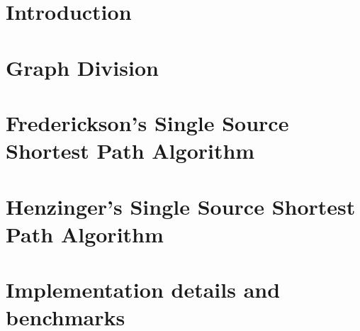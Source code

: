 \documentclass{report}
\begin{document}

\pagebreak

\tableofcontents

\pagebreak

\chapter{Introduction}


\chapter{Graph Division}


\chapter{Frederickson's Single Source Shortest Path Algorithm}


\chapter {Henzinger's Single Source Shortest Path Algorithm}


\chapter {Implementation details and benchmarks}



\printbibliography
\end{document}
